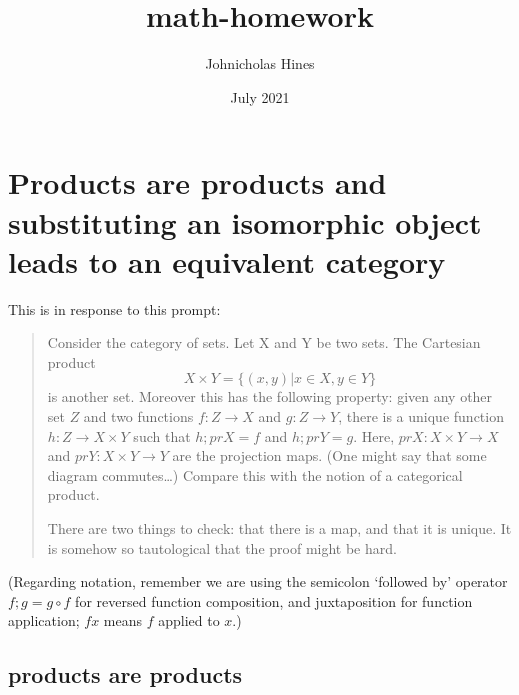 \documentclass{proc-l}
\title{math-homework}
\author{Johnicholas Hines}
\date{July 2021}
\theoremstyle{definition}
\theoremstyle{remark}
\numberwithin{equation}{section}
\begin{document}
\maketitle

\section{Products are products and substituting an isomorphic object leads to an equivalent category}




This is in response to this prompt:

\begin{quote}
Consider the category of sets. Let X and Y be two sets. The Cartesian product
\[
X \times Y = \{(x,y) | x \in X, y \in Y\}
\]
is another set. Moreover this has the following property: given any other set \(Z\) and two functions \(f: Z \to X\) and \(g: Z \to Y\), there is a unique function \(h: Z \to X \times Y\) such that \(h; pr X = f\) and \(h ; pr Y = g\). Here, \(pr X: X \times Y \to X\) and \(pr Y: X \times Y \to Y\) are the projection maps. (One might say that some diagram commutes…) Compare this with the notion of a categorical product. 

There are two things to check: that there is a map, and that it is unique. It is somehow so tautological that the proof might be hard.
\end{quote}

(Regarding notation, remember we are using the semicolon `followed by' operator \(f; g = g \circ f\) for reversed function composition, and juxtaposition for function application; \(f x\) means \(f\) applied to \(x\).)

\subsection{products are products}
\end{document}
